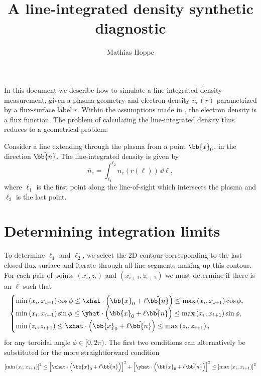 \documentclass{notes}
\title{A line-integrated density synthetic diagnostic}
\author{Mathias Hoppe}
\newcommand{\nhat}{\hat{\bb{n}}}
\begin{document}
	\maketitle

	In this document we describe how to simulate a line-integrated density
	measurement, given a plasma geometry and electron density $n_e(r)$
	parametrized by a flux-surface label $r$. Within the assumptions made in
	\DREAM, the electron density is a flux function. The problem of calculating
	the line-integrated density thus reduces to a geometrical problem.

	Consider a line extending through the plasma from a point $\bb{x}_0$, in
	the direction $\nhat$. The line-integrated density is given by
	\begin{equation}
		\bar{n}_e =
			\int_{\ell_1}^{\ell_2} n_e\left(r(\ell)\right)\,\dd\ell,
	\end{equation}
	where $\ell_1$ is the first point along the line-of-sight which intersects
	the plasma and $\ell_2$ is the last point.

	\section*{Determining integration limits}
	To determine $\ell_1$ and $\ell_2$, we select the 2D contour corresponding
	to the last closed flux surface and iterate through all line segments making
	up this contour. For each pair of points $(x_i,z_i)$ and $(x_{i+1},z_{i+1})$
	we must determine if there is an $\ell$ such that
	\begin{equation}
		\begin{cases}
			\min\left(x_i,x_{i+1}\right)\cos\phi \leq \xhat\cdot\left(\bb{x}_0+\ell\nhat\right) \leq \max\left(x_i,x_{i+1}\right)\cos\phi,\\
			\min\left(x_i,x_{i+1}\right)\sin\phi \leq \yhat\cdot\left(\bb{x}_0+\ell\nhat\right) \leq \max\left(x_i,x_{i+1}\right)\sin\phi,\\
			\min\left(z_i,z_{i+1}\right)\leq \zhat\cdot\left(\bb{x}_0+\ell\nhat\right) \leq \max\left(z_i,z_{i+1}\right),
		\end{cases}
	\end{equation}
	for any toroidal angle $\phi\in[0,2\pi)$. The first two conditions can
	alternatively be substituted for the more straightforward condition
	\begin{equation}
		\left[\min\left(x_i,x_{i+1}\right)\right]^2\leq
		\left[\xhat\cdot\left(\bb{x}_0+\ell\nhat\right)\right]^2 +
		\left[\yhat\cdot\left(\bb{x}_0+\ell\nhat\right)\right]^2 \leq
		\left[\max\left(x_i,x_{i+1}\right)\right]^2
	\end{equation}
\end{document}
